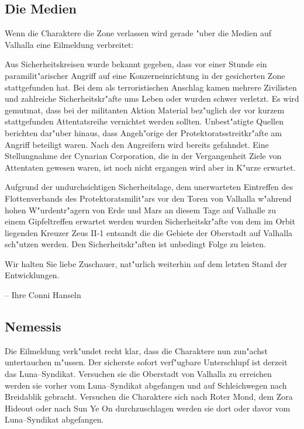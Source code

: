 
\subsection{Die Medien} 
Wenn die Charaktere die Zone verlassen wird gerade "uber die Medien auf Valhalla eine Eilmeldung verbreitet:

\begin{speech}
Aus Sicherheitskreisen wurde bekannt gegeben, dass vor einer Stunde ein paramilit"arischer Angriff auf eine Konzerneinrichtung in der gesicherten Zone stattgefunden hat. Bei dem als terroristischen Anschlag kamen mehrere Zivilisten und zahlreiche Sicherheitskr"afte ums Leben oder wurden schwer verletzt. Es wird gemutma\3t, dass bei der militanten Aktion Material bez"uglich der vor kurzem stattgefunden Attentatsreihe vernichtet werden sollten. Unbest"atigte Quellen berichten dar"uber hinaus, dass Angeh"orige der Protektoratsstreitkr"afte am Angriff beteiligt waren. Nach den Angreifern wird bereits gefahndet. Eine Stellungnahme der Cynarian Corporation, die in der Vergangenheit Ziele von Attentaten gewesen waren, ist noch nicht ergangen wird aber in K"urze erwartet.

Aufgrund der undurchsichtigen Sicherheitslage, dem unerwarteten Eintreffen des Flottenverbands des Protektoratsmilit"ars vor den Toren von Valhalla w"ahrend hohen W"urdentr"agern von Erde und Mars an diesem Tage auf Valhalle zu einem Gipfeltreffen erwartet werden wurden Sicherheitskr"afte von dem im Orbit liegenden Kreuzer Zeus II-1 entsandt die die Gebiete der Oberstadt auf Valhalla sch"utzen werden. Den Sicherheitskr"aften ist unbedingt Folge zu leisten.

Wir halten Sie liebe Zuschauer, nat"urlich weiterhin auf dem letzten Stand der Entwicklungen.

\nopagebreak
-- Ihre Conni Hanseln
\end{speech}

\subsection{Nemessis} 
Die Eilmeldung verk"undet recht klar, dass die Charaktere nun zun"achst untertauchen m"ussen. Der sicherste sofort verf"ugbare Unterschlupf ist derzeit das Luna--Syndikat. Versuchen sie die Oberstadt von Valhalla zu erreichen werden sie vorher vom Luna--Syndikat abgefangen und auf Schleichwegen nach Breidablik gebracht. Versuchen die Charaktere sich nach Roter Mond, dem Zora Hideout oder nach Sun Ye On durchzuschlagen werden sie dort oder davor vom Luna--Syndikat abgefangen.

